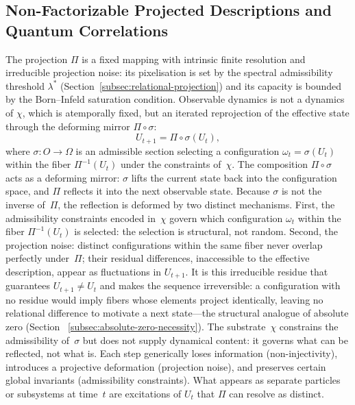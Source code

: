\subsection{Non-Factorizable Projected Descriptions and Quantum Correlations}
  \label{subsec:non-injective-projection}

  The projection $\Pi$ is a fixed mapping with intrinsic finite resolution
  and irreducible projection noise: its pixelisation is set by the spectral
  admissibility threshold $\lambda^*$ (Section~\ref{subsec:relational-projection})
  and its capacity is bounded by the Born--Infeld saturation condition.
  Observable dynamics is not a dynamics of $\chi$, which is atemporally
  fixed, but an iterated reprojection of the effective state through the
  deforming mirror $\Pi \circ \sigma$:
  \begin{equation}
    \label{eq:reprojection-mirror}
    U_{t+1} = \Pi \circ \sigma(U_t),
  \end{equation}
  where $\sigma : O \to \Omega$ is an admissible section selecting a
  configuration $\omega_t = \sigma(U_t)$ within the fiber $\Pi^{-1}(U_t)$
  under the constraints of~$\chi$.
  The composition $\Pi \circ \sigma$ acts as a deforming mirror:
  $\sigma$ lifts the current state back into the configuration space,
  and $\Pi$ reflects it into the next observable state.
  Because $\sigma$ is not the inverse of~$\Pi$, the reflection is
  deformed by two distinct mechanisms.
  First, the admissibility constraints encoded in~$\chi$ govern which
  configuration $\omega_t$ within the fiber $\Pi^{-1}(U_t)$ is selected:
  the selection is structural, not random.
  Second, the projection noise: distinct configurations within the same
  fiber never overlap perfectly under~$\Pi$; their residual differences,
  inaccessible to the effective description, appear as fluctuations in
  $U_{t+1}$.
  It is this irreducible residue that guarantees $U_{t+1} \neq U_t$ and
  makes the sequence irreversible: a configuration with no residue would
  imply fibers whose elements project identically, leaving no relational
  difference to motivate a next state---the structural analogue of
  absolute zero (Section ~\ref{subsec:absolute-zero-necessity}).
  The substrate~$\chi$ constrains the admissibility of~$\sigma$ but does
  not supply dynamical content: it governs what can be reflected, not what
  is.
  Each step generically loses information (non-injectivity), introduces a
  projective deformation (projection noise), and preserves certain global
  invariants (admissibility constraints).
  What appears as separate particles or subsystems at time~$t$ are
  excitations of $U_t$ that $\Pi$ can resolve as distinct.

